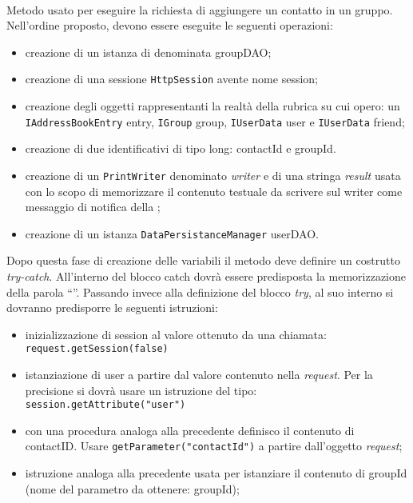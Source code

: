\begin{description}
	\item{}\\	
	Metodo usato per eseguire la richiesta di aggiungere un contatto in un gruppo. Nell'ordine proposto, devono essere eseguite le seguenti operazioni:
	\begin{itemize}
		\item creazione di un istanza di  denominata groupDAO;
		\item creazione di una sessione \texttt{HttpSession} avente nome session;
		\item creazione degli oggetti rappresentanti la realtà della rubrica su cui opero: un \texttt{IAddressBookEntry} entry, \texttt{IGroup} group, \texttt{IUserData} user e \texttt{IUserData} friend;
		\item creazione di due identificativi di tipo long: contactId e groupId.
		\item creazione di un \texttt{PrintWriter} denominato \textit{writer} e di una stringa \textit{result} usata con lo scopo di memorizzare il contenuto testuale da scrivere sul writer come messaggio di notifica della ;
		\item creazione di un istanza \texttt{DataPersistanceManager} userDAO.
	\end{itemize}
	Dopo questa fase di creazione delle variabili il metodo deve definire un costrutto \textit{try-catch}. All'interno del blocco catch dovrà essere predisposta la memorizzazione della parola ``''. Passando invece alla definizione del blocco \textit{try}, al suo interno si dovranno predisporre le seguenti istruzioni:
	\begin{itemize}
		\item inizializzazione di session al valore ottenuto da una chiamata:\\
		\verb|request.getSession(false)|
		\item istanziazione di user a partire dal valore contenuto nella \textit{request}. Per la precisione si dovrà usare un istruzione del tipo:\\
		\verb|session.getAttribute("user")|
		\item con una procedura analoga alla precedente definisco il contenuto di contactID. Usare \verb|getParameter("contactId")| a partire dall'oggetto \textit{request};
		\item istruzione analoga alla precedente usata per istanziare il contenuto di groupId (nome del parametro da ottenere: groupId);

\end{itemize}
\end{description}
